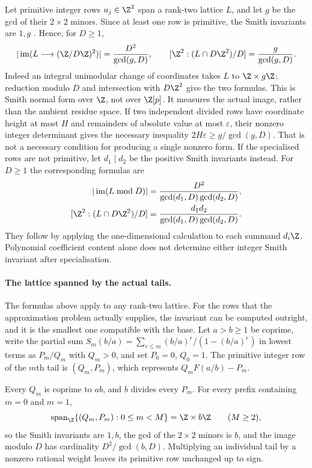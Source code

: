 Let primitive integer rows $u_j\in\Z^2$ span a rank-two lattice $L$, and
let $g$ be the gcd of their $2\times2$ minors. Since at least one row is
primitive, the Smith invariants are $1,g$
\cite[Thms.~2.3--2.4, p.~3]{stanley2016}. Hence, for $D\ge1$,
\[
 |\operatorname{im}(L\longrightarrow(\Z/D\Z)^2)|
 =\frac{D^2}{\gcd(g,D)},\qquad
 [\Z^2:(L\cap D\Z^2)/D]=\frac{g}{\gcd(g,D)}.
\]
Indeed an integral unimodular change of coordinates takes $L$ to
$\Z\times g\Z$; reduction modulo $D$ and intersection with $D\Z^2$
give the two formulas. This is Smith normal form over $\Z$, not over
$\Z[p]$. It measures the actual image, rather than the ambient residue space. If two independent divided rows have coordinate height at most
$H$ and remainders of absolute value at most $\varepsilon$, their nonzero
integer determinant gives the necessary inequality
$2H\varepsilon\ge g/\gcd(g,D)$. That is not a necessary condition for
producing a single nonzero form.
If the specialised rows are not primitive, let $d_1\mid d_2$ be the
positive Smith invariants instead. For $D\ge1$ the corresponding formulas are
\[
\begin{aligned}
 |\operatorname{im}(L\bmod D)|
 &=\frac{D^2}{\gcd(d_1,D)\gcd(d_2,D)},\\
 [\Z^2:(L\cap D\Z^2)/D]
 &=\frac{d_1d_2}{\gcd(d_1,D)\gcd(d_2,D)}.
\end{aligned}
\]
They follow by applying the one-dimensional calculation to each summand
$d_i\Z$. Polynomial coefficient content alone does not determine either
integer Smith invariant after specialisation.

\paragraph{The lattice spanned by the actual tails.}
The formulas above apply to any rank-two lattice. For the rows that the
approximation problem actually supplies, the invariant can be computed
outright, and it is the smallest one compatible with the base. Let $a>b\ge1$ be
coprime, write the partial sum $S_m(b/a)=\sum_{r\le m}(b/a)^r/(1-(b/a)^r)$ in
lowest terms as $P_m/Q_m$ with $Q_m>0$, and set $P_0=0$, $Q_0=1$. The primitive
integer row of the $m$th tail is $(Q_m,P_m)$, which represents
$Q_mF(a/b)-P_m$.

\begin{proposition}
\label{long1049:res:tail-lattice}
Every $Q_m$ is coprime to $ab$, and $b$ divides every $P_m$. For every prefix
containing $m=0$ and $m=1$,
\[
 \operatorname{span}_{\Z}\{(Q_m,P_m):0\le m<M\}=\Z\times b\Z
 \qquad(M\ge2),
\]
so the Smith invariants are $1,b$, the gcd of the $2\times2$ minors is $b$, and
the image modulo $D$ has cardinality $D^2/\gcd(b,D)$. Multiplying an individual
tail by a nonzero rational weight leaves its primitive row unchanged up to
sign.
\end{proposition}

